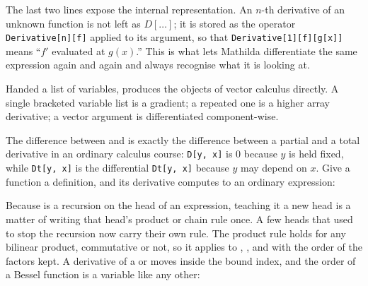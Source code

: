 The last two lines expose the internal representation. An \(n\)-th derivative of
an unknown function is not left as \(D[\ldots]\); it is stored as the operator
\texttt{Derivative[n][f]} applied to its argument, so that
\texttt{Derivative[1][f][g[x]]} means ``\(f'\) evaluated at \(g(x)\).'' This is
what lets Mathilda differentiate the same expression again and again and always
recognise what it is looking at.

Handed a list of variables,  produces the objects of vector calculus
directly. A single bracketed variable list is a gradient; a repeated one is a
higher array derivative; a vector argument is differentiated component-wise.

\begin{codepairs}
\end{codepairs}

The difference between  and  is exactly the
difference between a partial and a total derivative in an ordinary calculus
course: \texttt{D[y, x]} is \(0\) because \(y\) is held fixed, while
\texttt{Dt[y, x]} is the differential \texttt{Dt[y, x]} because \(y\) may depend
on \(x\). Give a function a definition, and its derivative computes to an
ordinary expression:

\begin{codepairs}
\end{codepairs}

Because  is a recursion on the head of an expression, teaching it a new head
is a matter of writing that head's product or chain rule once. A few heads that
used to stop the recursion now carry their own rule. The product rule holds for any
bilinear product, commutative or not, so it applies to ,
, and  with the order of the factors kept. A
derivative of a  or  moves inside the bound index, and the order
of a Bessel function is a variable like any other:

